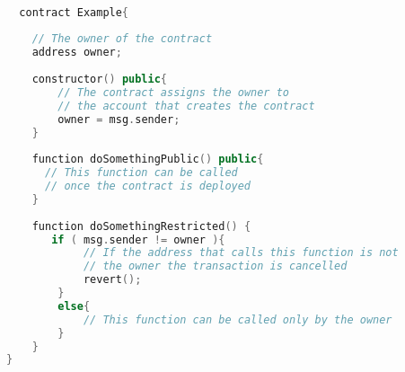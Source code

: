 \begin{minipage}{\linewidth}
\begin{lstlisting}[language=C++,commentstyle=\color{olive}\ttfamily,frame=single,caption=Example
  of an smart contract,label=contrxample,captionpos=b]

  contract Example{
    
    // The owner of the contract
    address owner;
    
    constructor() public{
        // The contract assigns the owner to 
        // the account that creates the contract
        owner = msg.sender;
    }
    
    function doSomethingPublic() public{
      // This function can be called
      // once the contract is deployed
    }
    
    function doSomethingRestricted() {
       if ( msg.sender != owner ){
            // If the address that calls this function is not
            // the owner the transaction is cancelled
            revert();
        }
        else{
            // This function can be called only by the owner
        }
    }
}
  
  \end{lstlisting}
  \end{minipage}